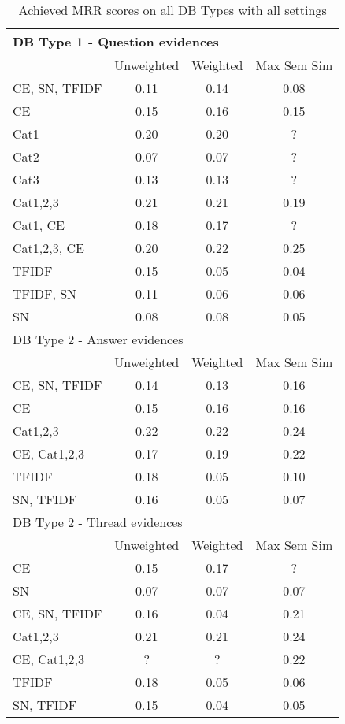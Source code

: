 \documentclass[conference]{IEEEtran}
\begin{document}
\begin{table*}[!h]
	\centering
	\renewcommand{\arraystretch}{1.3}
	\caption{Achieved MRR scores on all DB Types with all settings}
	\label{tab:resultsmrr0}
	\begin{tabular}{l||ccc}\hline
	
		\multicolumn{4}{l}{DB Type 1 - Question evidences}\\\hline\hline
		& Unweighted & Weighted & Max Sem Sim\\
		CE, SN, TFIDF & 0.11 & 0.14 & 0.08\\
		CE & 0.15 & 0.16 & 0.15\\
		Cat1 & 0.20 & 0.20 & ?\\
		Cat2 & 0.07 & 0.07 & ?\\
		Cat3 & 0.13 & 0.13 & ?\\
		Cat1,2,3 & 0.21 & 0.21 & 0.19\\
		Cat1, CE & 0.18 & 0.17 & ?\\
		Cat1,2,3, CE & 0.20 & 0.22 & 0.25\\
		TFIDF & 0.15 & 0.05 & 0.04\\
		TFIDF, SN & 0.11 & 0.06 & 0.06\\
		SN & 0.08 & 0.08 & 0.05\\
		\hline
		
		\multicolumn{4}{l}{DB Type 2 - Answer evidences}\\\hline\hline
		& Unweighted & Weighted & Max Sem Sim\\
		CE, SN, TFIDF & 0.14 & 0.13 & 0.16\\
		CE & 0.15 & 0.16 & 0.16\\
		Cat1,2,3 & 0.22 & 0.22 & 0.24\\
		CE, Cat1,2,3 & 0.17 & 0.19 & 0.22\\
		TFIDF & 0.18 & 0.05 & 0.10\\
		SN, TFIDF & 0.16 & 0.05 & 0.07\\
		\hline
		
		\multicolumn{4}{l}{DB Type 2 - Thread evidences}\\\hline\hline
		& Unweighted & Weighted & Max Sem Sim\\
		CE & 0.15 & 0.17 & ?\\
		SN & 0.07 & 0.07 & 0.07\\
		CE, SN, TFIDF & 0.16 & 0.04 & 0.21\\
		Cat1,2,3 & 0.21 & 0.21 & 0.24\\
		CE, Cat1,2,3 & ? & ? & 0.22\\
		TFIDF & 0.18 & 0.05 & 0.06\\
		SN, TFIDF & 0.15 & 0.04 & 0.05\\
		\hline
		

\end{tabular}
\end{table*}
\end{document}
